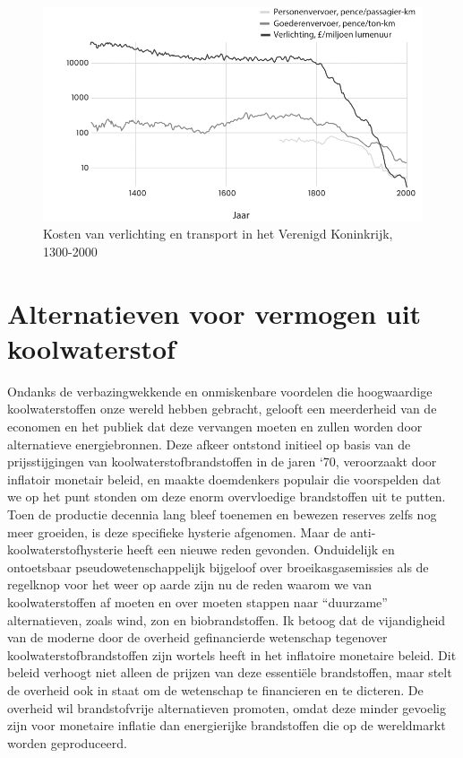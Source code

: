 \begin{figure}[!htb]
\centering
    \includegraphics[width=\textwidth]{figures/fig16-1.png}
    \caption[Kosten van verlichting en transport in het Verenigd Koninkrijk, 1300-2000]{Kosten van verlichting en transport in het Verenigd Koninkrijk, 1300-2000}
    \label{fig16}
\end{figure}


\hypertarget{alternatieven-voor-vermogen-uit-koolwaterstof}{%
\section{Alternatieven voor vermogen uit koolwaterstof}\label{alternatieven-voor-vermogen-uit-koolwaterstof}}

Ondanks de verbazingwekkende en onmiskenbare voordelen die hoogwaardige koolwaterstoffen onze wereld hebben gebracht, gelooft een meerderheid van de economen en het publiek dat deze vervangen moeten en zullen worden door alternatieve energiebronnen. Deze afkeer ontstond initieel op basis van de prijsstijgingen van koolwaterstofbrandstoffen in de jaren `70, veroorzaakt door inflatoir monetair beleid, en maakte doemdenkers populair die voorspelden dat we op het punt stonden om deze enorm overvloedige brandstoffen uit te putten. Toen de productie decennia lang bleef toenemen en bewezen reserves zelfs nog meer groeiden, is deze specifieke hysterie afgenomen. Maar de anti-koolwaterstofhysterie heeft een nieuwe reden gevonden. Onduidelijk en ontoetsbaar pseudowetenschappelijk bijgeloof over broeikasgasemissies als de regelknop voor het weer op aarde zijn nu de reden waarom we van koolwaterstoffen af moeten en over moeten stappen naar ``duurzame''  alternatieven, zoals wind, zon en biobrandstoffen. Ik betoog dat de vijandigheid van de moderne door de overheid gefinancierde wetenschap tegenover koolwaterstofbrandstoffen zijn wortels heeft in het inflatoire monetaire beleid. Dit beleid verhoogt niet alleen de prijzen van deze essentiële brandstoffen, maar stelt de overheid ook in staat om de wetenschap te financieren en te dicteren. De overheid wil brandstofvrije alternatieven promoten, omdat deze minder gevoelig zijn voor monetaire inflatie dan energierijke brandstoffen die op de wereldmarkt worden geproduceerd.

